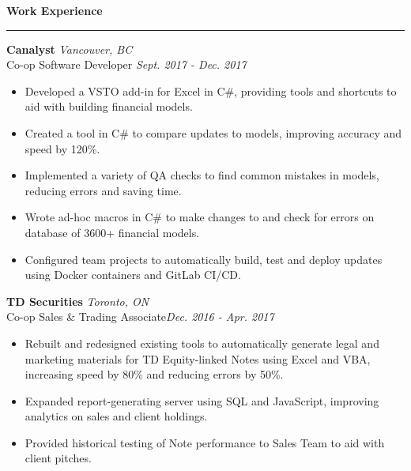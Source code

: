 \documentclass{letter}
\begin{document}
	\begin{flushleft}
		{\Large \textbf{Work Experience}}
		\rule[5pt]{\textwidth}{0.4pt}
		\vspace{-15pt}
		{\large\textbf{Canalyst}}  \hfill \textit{Vancouver, BC} \\
		\vspace{15pt}
		Co-op Software Developer \hfill \textit{Sept. 2017 - Dec. 2017}
		\vspace{-9pt}
		\begin{itemize}
			\item Developed a VSTO add-in for Excel in C\#, providing tools and shortcuts to aid with building financial models.\vspace{-3pt}
			\item Created a tool in C\# to compare updates to models, improving accuracy and speed by 120\%.\vspace{-3pt}
			\item Implemented a variety of QA checks to find common mistakes in models, reducing errors and saving time. \vspace{-3pt}
			\item Wrote ad-hoc macros in C\# to make changes to and check for errors on database of 3600+ financial models. \vspace{-3pt}
			\item Configured team projects to automatically build, test and deploy updates using Docker containers and GitLab CI/CD.
		\end{itemize}

		{\large\textbf{TD Securities}}  \hfill \textit{Toronto, ON} \\
		\vspace{1pt}
		Co-op Sales \& Trading Associate\hfill \textit{Dec. 2016 - Apr. 2017}
		\vspace{-9pt}
		\begin{itemize}
			\item Rebuilt and redesigned existing tools to automatically generate legal and marketing materials for TD Equity-linked Notes using Excel and VBA, increasing speed by 80\% and reducing errors by 50\%. \vspace{-3pt}
			\item Expanded report-generating server using SQL and JavaScript, improving analytics on sales and client holdings. \vspace{-3pt}
			\item Provided historical testing of Note performance to Sales Team to aid with client pitches.
		\end{itemize}
	

\end{flushleft}
\end{document}
